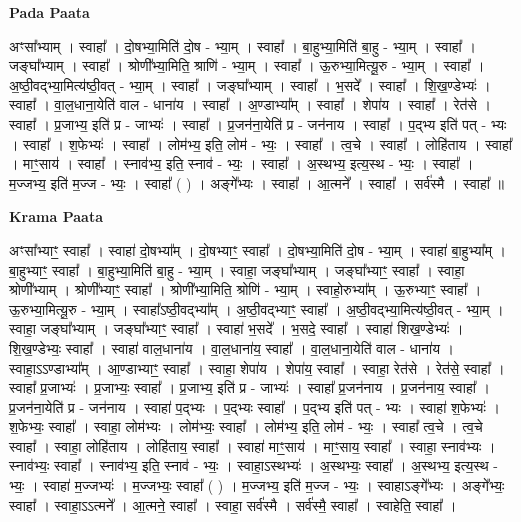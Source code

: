 \documentclass[17pt]{extarticle}
\begin{document}
\textbf{Pada Paata} \newline

अꣳसा᳚भ्याम् । स्वाहा᳚ । दो॒षभ्या॒मिति॑ दो॒ष - भ्या॒म् । स्वाहा᳚ । बा॒हुभ्या॒मिति॑ बा॒हु - भ्या॒म् । स्वाहा᳚ । जङ्घा᳚भ्याम् । स्वाहा᳚ । श्रोणी᳚भ्या॒मिति॒ श्राणि॑ - भ्या॒म् । स्वाहा᳚ । ऊ॒रुभ्या॒मित्यू॒रु - भ्या॒म् । स्वाहा᳚ । अ॒ष्ठी॒वद्भ्या॒मित्य॑ष्ठी॒वत् - भ्या॒म् । स्वाहा᳚ । जङ्घा᳚भ्याम् । स्वाहा᳚ । भ॒सदे᳚ । स्वाहा᳚ । शि॒ख॒ण्डेभ्यः॑ । स्वाहा᳚ । वा॒ल॒धाना॒येति॑ वाल - धाना॑य । स्वाहा᳚ । अ॒ण्डाभ्या᳚म् । स्वाहा᳚ । शेपा॑य । स्वाहा᳚ । रेत॑से । स्वाहा᳚ । प्र॒जाभ्य॒ इति॑ प्र - जाभ्यः॑ । स्वाहा᳚ । प्र॒जन॑ना॒येति॑ प्र - जन॑नाय । स्वाहा᳚ । प॒द्भ्य इति॑ पत् - भ्यः । स्वाहा᳚ । श॒फेभ्यः॑ । स्वाहा᳚ । लोम॑भ्य॒ इति॒ लोम॑ - भ्यः॒ । स्वाहा᳚ । त्व॒चे । स्वाहा᳚ । लोहि॑ताय । स्वाहा᳚ । माꣳ॒॒साय॑ । स्वाहा᳚ । स्नाव॑भ्य॒ इति॒ स्नाव॑ - भ्यः॒ । स्वाहा᳚ । अ॒स्थभ्य॒ इत्य॒स्थ - भ्यः॒ । स्वाहा᳚ । म॒ज्जभ्य॒ इति॑ म॒ज्ज - भ्यः॒ । स्वाहा᳚ ( ) । अङ्गे᳚भ्यः । स्वाहा᳚ । आ॒त्मने᳚ । स्वाहा᳚ । सर्व॑स्मै । स्वाहा᳚ ॥  \newline


\textbf{Krama Paata} \newline

अꣳसा᳚भ्याꣳ॒॒ स्वाहा᳚ । स्वाहा॑ दो॒षभ्या᳚म् । दो॒षभ्याꣳ॒॒ स्वाहा᳚ । दो॒षभ्या॒मिति॑ दो॒ष - भ्या॒म् । स्वाहा॑ बा॒हुभ्या᳚म् । बा॒हुभ्याꣳ॒॒ स्वाहा᳚ । बा॒हुभ्या॒मिति॑ बा॒हु - भ्या॒म् । स्वाहा॒ जङ्‍घा᳚भ्याम् । जङ्‍घा᳚भ्याꣳ॒॒ स्वाहा᳚ । स्वाहा॒ श्रोणी᳚भ्याम् । श्रोणी᳚भ्याꣳ॒॒ स्वाहा᳚ । श्रोणी᳚भ्या॒मिति॒ श्रोणि॑ - भ्या॒म् । स्वाहो॒रुभ्या᳚म् । ऊ॒रुभ्याꣳ॒॒ स्वाहा᳚ । ऊ॒रुभ्या॒मित्यू॒रु - भ्या॒म् । स्वाहा᳚ऽष्ठी॒वद्भ्या᳚म् । अ॒ष्ठी॒वद्भ्याꣳ॒॒ स्वाहा᳚ । अ॒ष्ठी॒वद्भ्या॒मित्य॑ष्ठी॒वत् - भ्या॒म् । स्वाहा॒ जङ्‍घा᳚भ्याम् । जङ्‍घा᳚भ्याꣳ॒॒ स्वाहा᳚ । स्वाहा॑ भ॒सदे᳚ । भ॒सदे॒ स्वाहा᳚ । स्वाहा॑ शिख॒ण्डेभ्यः॑ । शि॒ख॒ण्डेभ्यः॒ स्वाहा᳚ । स्वाहा॑ वाल॒धाना॑य । वा॒ल॒धाना॑य॒ स्वाहा᳚ । वा॒ल॒धाना॒येति॑ वाल - धाना॑य । स्वाहा॒ऽऽण्डाभ्या᳚म् । आ॒ण्डाभ्याꣳ॒॒ स्वाहा᳚ । स्वाहा॒ शेपा॑य । शेपा॑य॒ स्वाहा᳚ । स्वाहा॒ रेत॑से । रेत॑से॒ स्वाहा᳚ । स्वाहा᳚ प्र॒जाभ्यः॑ । प्र॒जाभ्यः॒ स्वाहा᳚ । प्र॒जाभ्य॒ इति॑ प्र - जाभ्यः॑ । स्वाहा᳚ प्र॒जन॑नाय । प्र॒जन॑नाय॒ स्वाहा᳚ । प्र॒जन॑ना॒येति॑ प्र - जन॑नाय । स्वाहा॑ प॒द्भ्यः । प॒द्भ्यः स्वाहा᳚ । प॒द्भ्य इति॑ पत् - भ्यः । स्वाहा॑ श॒फेभ्यः॑ । श॒फेभ्यः॒ स्वाहा᳚ । स्वाहा॒ लोम॑भ्यः । लोम॑भ्यः॒ स्वाहा᳚ । लोम॑भ्य॒ इति॒ लोम॑ - भ्यः॒ । स्वाहा᳚ त्व॒चे । त्व॒चे स्वाहा᳚ । स्वाहा॒ लोहि॑ताय । लोहि॑ताय॒ स्वाहा᳚ । स्वाहा॑ माꣳ॒॒साय॑ । माꣳ॒॒साय॒ स्वाहा᳚ । स्वाहा॒ स्नाव॑भ्यः । स्नाव॑भ्यः॒ स्वाहा᳚ । स्नाव॑भ्य॒ इति॒ स्नाव॑ - भ्यः॒ । स्वाहा॒ऽस्थभ्यः॑ । अ॒स्थभ्यः॒ स्वाहा᳚ । अ॒स्थभ्य॒ इत्य॒स्थ - भ्यः॒ । स्वाहा॑ म॒ज्जभ्यः॑ । म॒ज्जभ्यः॒ स्वाहा᳚ ( ) । म॒ज्जभ्य॒ इति॑ म॒ज्ज - भ्यः॒ । स्वाहाऽङ्‍गे᳚भ्यः । अङ्‍गे᳚भ्यः॒ स्वाहा᳚ । स्वाहा॒ऽऽत्मने᳚ । आ॒त्मने॒ स्वाहा᳚ । स्वाहा॒ सर्व॑स्मै । सर्व॑स्मै॒ स्वाहा᳚ । स्वाहेति॒ स्वाहा᳚ । \newline
\end{document}
